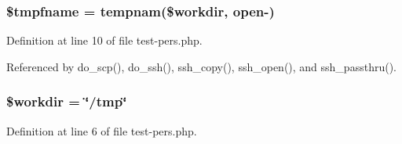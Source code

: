 \subsubsection{\setlength{\rightskip}{0pt plus 5cm}\$tmpfname = tempnam(\$workdir, open-)}\label{test-pers_8php_a4}




Definition at line 10 of file test-pers.php.

Referenced by do\_\-scp(), do\_\-ssh(), ssh\_\-copy(), ssh\_\-open(), and ssh\_\-passthru().
\subsubsection{\setlength{\rightskip}{0pt plus 5cm}\$workdir = \char`\"{}/tmp\char`\"{}}\label{test-pers_8php_a3}




Definition at line 6 of file test-pers.php.